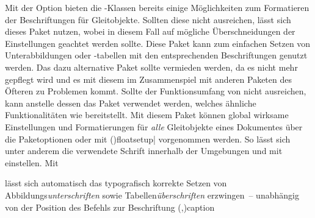 %
%
\begin{DeclarePackages}[Gleitobjekte|?]
  Mit der Option 
  bieten die \KOMAScript-Klassen bereits einige Möglichkeiten zum Formatieren 
  der Beschriftungen für Gleitobjekte. Sollten diese nicht ausreichen, lässt sich 
  dieses Paket nutzen, wobei in diesem Fall auf mögliche Überschneidungen der 
  Einstellungen geachtet werden sollte.
  Diese Paket kann zum einfachen Setzen von Unterabbildungen oder -tabellen 
  mit den entsprechenden Beschriftungen genutzt werden. Das dazu alternative 
  Paket  sollte vermieden werden, da es nicht mehr gepflegt 
  wird und es mit diesem im Zusammenspiel mit anderen Paketen des Öfteren zu 
  Problemen kommt. Sollte der Funktionsumfang von  nicht 
  ausreichen, kann anstelle dessen das Paket  verwendet 
  werden, welches ähnliche Funktionalitäten wie  bereitstellt.
  Mit diesem Paket können global wirksame Einstellungen und Formatierungen für 
  \emph{alle} Gleitobjekte eines Dokumentes über die Paketoptionen oder mit 
  \Macro(){floatsetup|\MPValue{\dots}} vorgenommen 
  werden. So lässt sich unter anderem die verwendete Schrift innerhalb der 
  Umgebungen  und  mit
   einstellen. Mit 
  \begin{Code}
  \end{Code}\vspace{-\baselineskip}%
  lässt sich automatisch das typografisch korrekte Setzen von 
  Abbildungs\emph{unterschriften} sowie Tabellen\emph{überschriften} 
  erzwingen~-- unabhängig von der Position des Befehls zur Beschriftung 
  \Macro(,){caption} 

\end{DeclarePackages}

